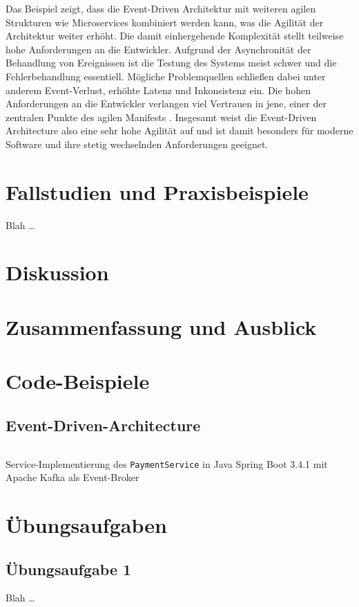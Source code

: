\documentclass[acmtog]{acmart}
\begin{document}
Das Beispiel zeigt, dass die Event-Driven Architektur mit weiteren agilen Strukturen wie Microservices kombiniert werden kann, was die Agilität der Architektur weiter erhöht.
Die damit einhergehende Komplexität stellt teilweise hohe Anforderungen an die Entwickler.
Aufgrund der Asynchronität der Behandlung von Ereignissen ist die Testung des Systems meist schwer und die Fehlerbehandlung essentiell.
Mögliche Problemquellen schließen dabei unter anderem Event-Verlust, erhöhte Latenz und Inkonsistenz ein.
Die hohen Anforderungen an die Entwickler verlangen viel Vertrauen in jene, einer der zentralen Punkte des agilen Manifests \cite{agileManifesto}.
Insgesamt weist die Event-Driven Architecture also eine sehr hohe Agilität auf und ist damit besonders für moderne Software und ihre stetig wechselnden Anforderungen geeignet.

\section{Fallstudien und Praxisbeispiele}
Blah \ldots

\section{Diskussion}

\section{Zusammenfassung und Ausblick}









\appendix

\section{Code-Beispiele}

\subsection{Event-Driven-Architecture}
\label{app:code:eda:paymentservice}
\begin{listing}[H]
  \tiny
  \inputminted[linenos=true]{java}{code/eda/PaymentService.java}
  \caption{Service-Implementierung des \texttt{PaymentService} in Java Spring Boot 3.4.1 mit Apache Kafka als Event-Broker}
  \label{listing:semigroup}
\end{listing}

\section{Übungsaufgaben}
\subsection{Übungsaufgabe 1 }
Blah \ldots
\end{document}
